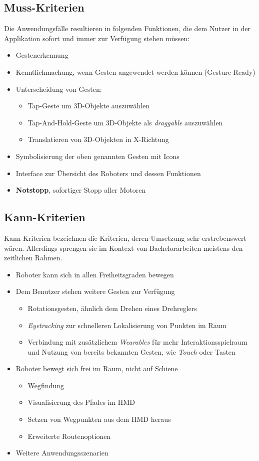 \subsection{Muss-Kriterien}
Die Anwendungsfälle resultieren in folgenden Funktionen, die dem Nutzer in der Applikation sofort und immer zur Verfügung stehen müssen:

\begin{itemize}
	\item Gestenerkennung
	\item Kenntlichmachung, wenn Gesten angewendet werden können (Gesture-Ready)
	\item Unterscheidung von Gesten:
	\begin{itemize}
		\item Tap-Geste um 3D-Objekte auszuwählen
		\item Tap-And-Hold-Geste um 3D-Objekte als \textit{draggable} auszuwählen
		\item Translatieren von 3D-Objekten in X-Richtung
	\end{itemize}
	\item Symbolisierung der oben genannten Gesten mit Icons
	\item Interface zur Übersicht des Roboters und dessen Funktionen
	\item \textbf{Notstopp}, sofortiger Stopp aller Motoren
\end{itemize}
\subsection{Kann-Kriterien}
Kann-Kriterien bezeichnen die Kriterien, deren Umsetzung sehr erstrebenswert wären. Allerdings sprengen sie im Kontext von Bachelorarbeiten meistens den zeitlichen Rahmen.

\begin{itemize}
	\item Roboter kann sich in allen Freiheitsgraden bewegen
	\item Dem Benutzer stehen weitere Gesten zur Verfügung
	\begin{itemize}
		\item Rotationsgesten, ähnlich dem Drehen eines Drehreglers
		\item \textit{Eyetracking} zur schnelleren Lokalisierung von Punkten im Raum
		\item Verbindung mit zusätzlichem \textit{Wearables} für mehr Interaktionsspielraum und Nutzung von bereits bekannten Gesten, wie \textit{Touch} oder Tasten
	\end{itemize}
	\item Roboter bewegt sich frei im Raum, nicht auf Schiene
	\begin{itemize}
		\item Wegfindung
		\item Visualisierung des Pfades im HMD
		\item Setzen von Wegpunkten aus dem HMD heraus
		\item Erweiterte Routenoptionen
	\end{itemize}
	\item Weitere Anwendungsszenarien
\end{itemize}
